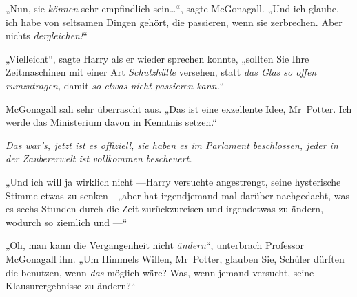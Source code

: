 „Nun, sie \emph{können} sehr empfindlich sein…“, sagte McGonagall. „Und ich glaube, ich habe von seltsamen Dingen gehört, die passieren, wenn sie zerbrechen. Aber nichts \emph{dergleichen!}“

„Vielleicht“, sagte Harry als er wieder sprechen konnte, „sollten Sie Ihre Zeitmaschinen mit einer Art \emph{Schutzhülle} versehen, statt \emph{das Glas so offen rumzutragen,} damit \emph{so etwas nicht passieren kann.}“

McGonagall sah sehr überrascht aus. „Das ist eine exzellente Idee, Mr~Potter. Ich werde das Ministerium davon in Kenntnis setzen.“

\emph{Das war's, jetzt ist es offiziell, sie haben es im Parlament beschlossen, jeder in der Zaubererwelt ist vollkommen bescheuert.}

„Und ich will ja wirklich nicht —Harry versuchte angestrengt, seine hysterische Stimme etwas zu senken—„aber hat irgendjemand mal darüber nachgedacht, was es  sechs Stunden durch die Zeit zurückzureisen und irgendetwas zu ändern, wodurch so ziemlich  und —“

„Oh, man kann die Vergangenheit nicht \emph{ändern}“, unterbrach Professor McGonagall ihn. „Um Himmels Willen, Mr~Potter, glauben Sie, Schüler dürften die benutzen, wenn \emph{das} möglich wäre? Was, wenn jemand versucht, seine Klausurergebnisse zu ändern?“

